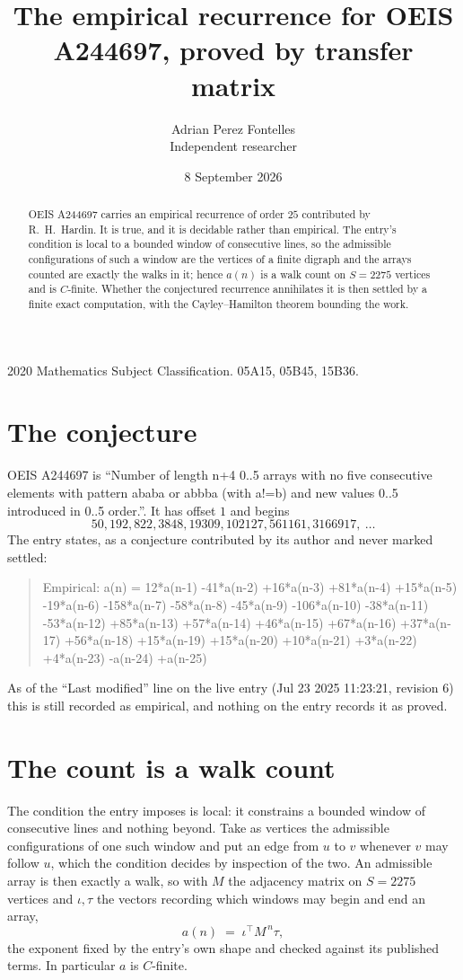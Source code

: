 \documentclass[11pt,a4paper]{article}
\title{The empirical recurrence for OEIS A244697, proved by transfer matrix}
\author{Adrian Perez Fontelles\\ \small Independent researcher}
\date{8 September 2026}
\theoremstyle{plain}
\theoremstyle{definition}
\begin{document}
\maketitle

\begin{abstract}
OEIS A244697 carries an empirical recurrence of order $25$ contributed by R.~H.~Hardin. It is
true, and it is decidable rather than empirical. The entry's condition is local to a bounded window of consecutive lines, so
the admissible configurations of such a window are the vertices of a finite digraph and the
arrays counted are exactly the walks in it; hence $a(n)$ is a walk count on $S=2275$ vertices
and is $C$-finite. Whether the conjectured recurrence annihilates it is then settled by a
finite exact computation, with the Cayley--Hamilton theorem bounding the work.
\end{abstract}

\noindent\small 2020 Mathematics Subject Classification. 05A15, 05B45, 15B36.\normalsize

\section{The conjecture}

OEIS A244697 is ``Number of length n+4 0..5 arrays with no five consecutive elements with pattern ababa or abbba (with a!=b) and new values 0..5 introduced in 0..5 order.''. It has offset $1$ and begins
\[
50, 192, 822, 3848, 19309, 102127, 561161, 3166917,\ \dots
\]
The entry states, as a conjecture contributed by its author and never marked settled:
\begin{quote}
Empirical: a(n) = 12*a(n-1) -41*a(n-2) +16*a(n-3) +81*a(n-4) +15*a(n-5) -19*a(n-6) -158*a(n-7) -58*a(n-8) -45*a(n-9) -106*a(n-10) -38*a(n-11) -53*a(n-12) +85*a(n-13) +57*a(n-14) +46*a(n-15) +67*a(n-16) +37*a(n-17) +56*a(n-18) +15*a(n-19) +15*a(n-20) +10*a(n-21) +3*a(n-22) +4*a(n-23) -a(n-24) +a(n-25)
\end{quote}
As of the ``Last modified'' line on the live entry (Jul 23 2025 11:23:21, revision 6) this is still
recorded as empirical, and nothing on the entry records it as proved.

\section{The count is a walk count}

The condition the entry imposes is local: it constrains a bounded window of consecutive lines and nothing beyond. Take as
vertices the admissible configurations of one such window and put an edge from $u$ to $v$
whenever $v$ may follow $u$, which the condition decides by inspection of the two. An
admissible array is then exactly a walk, so with $M$ the adjacency matrix on $S=2275$ vertices
and $\iota,\tau$ the vectors recording which windows may begin and end an array,
\[
a(n)\;=\;\iota^{\!\top}M^{\,n}\tau ,
\]
the exponent fixed by the entry's own shape and checked against its published terms. In
particular $a$ is $C$-finite.
\end{document}
